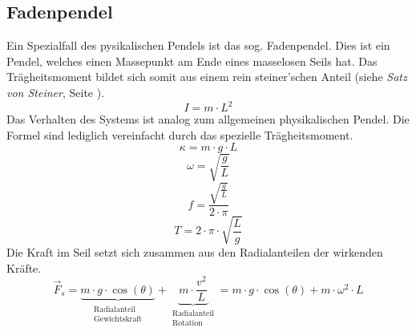 \subsection{Fadenpendel}
Ein Spezialfall des pysikalischen Pendels ist das sog. Fadenpendel. 
Dies ist ein Pendel, welches einen Massepunkt am Ende eines masselosen
Seils hat. Das Trägheitsmoment bildet sich somit aus einem rein 
steiner'schen Anteil (siehe \textit{Satz von Steiner}, 
Seite \pageref{sec:steiner}).
\[ \boxed{I = m \cdot L^2} \]
Das Verhalten des Systems ist analog zum allgemeinen physikalischen
Pendel. Die Formel sind lediglich vereinfacht durch das spezielle
Trägheitsmoment.
\[ \boxed{\kappa = m \cdot g \cdot L} \]
\[ \boxed{\omega = \sqrt{\frac{g}{L}}} \]
\[ \boxed{f = \frac{\sqrt{\frac{g}{L}}}{2 \cdot \pi}} \]
\[ \boxed{T = 2 \cdot \pi \cdot \sqrt{\frac{L}{g}}} \]
Die Kraft im Seil setzt sich zusammen aus den Radialanteilen der
wirkenden Kräfte.
\[ \boxed{\vec{F}_s 
	= \underbrace{ 
		m \cdot g \cdot \cos(\theta)
	}_{\substack{\text{Radialanteil}\\\text{Gewichtskraft}}}
	+ \underbrace{
		m \cdot \frac{v^2}{L}
	}_{\substack{\text{Radialanteil}\\\text{Rotation}}}
	= m \cdot g \cdot \cos(\theta) + m \cdot \omega^2 \cdot L
} \]

